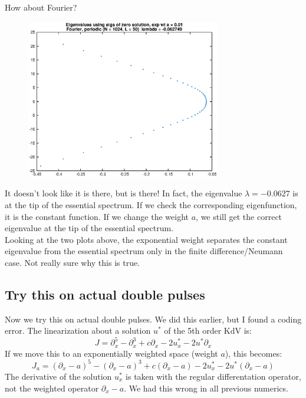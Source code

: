 \documentclass[12pt]{article}
\begin{document}
How about Fourier?
\begin{figure}[H]
\includegraphics[width=8.5cm]{zeroeigsfourier.eps}
\end{figure}
It doesn't look like it is there, but is there! In fact, the eigenvalue $\lambda = -0.0627$ is at the tip of the essential spectrum. If we check the corresponding eigenfunction, it is the constant function. If we change the weight $a$, we still get the correct eigenvalue at the tip of the essential spectrum.\\

Looking at the two plots above, the exponential weight separates the constant eigenvalue from the essential spectrum only in the finite difference/Neumann case. Not really sure why this is true.

\subsection*{Try this on actual double pulses}
Now we try this on actual double pulses. We did this earlier, but I found a coding error. The linearization about a solution $u^*$ of the 5th order KdV is:
\[
J = \partial_x^5 - \partial_x^3 + c \partial_x - 2 u^*_x - 2 u^* \partial_x
\]
If we move this to an exponentially weighted space (weight $a$), this becomes:
\[
J_a = (\partial_x - a)^5 - (\partial_x - a)^3 + c (\partial_x - a) - 2 u^*_x - 2 u^* (\partial_x-a)
\]
The derivative of the solution $u^*_x$ is taken with the regular differentation operator, not the weighted operator $\partial_x - a$. We had this wrong in all previous numerics.\\
\end{document}
